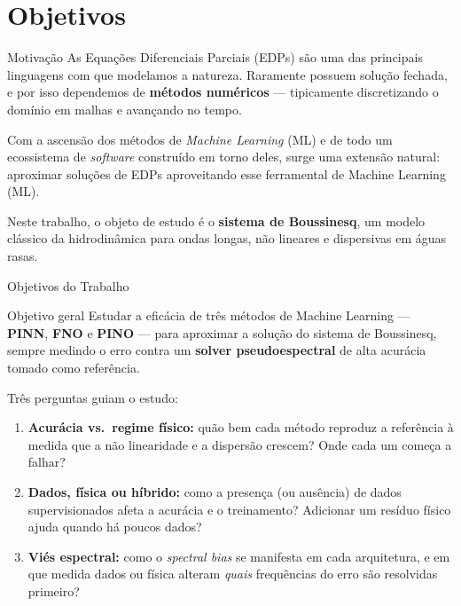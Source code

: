\section{Objetivos}

\begin{frame}{Motivação}
  As Equações Diferenciais Parciais (EDPs) são uma das principais linguagens com que
  modelamos a natureza. Raramente possuem solução fechada, e por isso dependemos de
  \textbf{métodos numéricos} --- tipicamente discretizando o domínio em malhas e avançando
  no tempo.

  \vspace{0.4cm}
  \begin{information}
    Com a ascensão dos métodos de \emph{Machine Learning} (ML) e de todo um ecossistema de
    \emph{software} construído em torno deles, surge uma extensão natural: aproximar
    soluções de EDPs \alert{aproveitando esse ferramental de Machine Learning} (ML).
  \end{information}

  \vspace{0.3cm}
  Neste trabalho, o objeto de estudo é o \textbf{sistema de Boussinesq}, um modelo clássico
  da hidrodinâmica para ondas longas, não lineares e dispersivas em águas rasas.
\end{frame}

\begin{frame}{Objetivos do Trabalho}
  \begin{block}{Objetivo geral}
    Estudar a \alert{eficácia} de três métodos de Machine Learning --- \textbf{PINN}, \textbf{FNO} e
    \textbf{PINO} --- para aproximar a solução do sistema de Boussinesq, sempre medindo o
    erro contra um \textbf{solver pseudoespectral} de alta acurácia tomado como referência.
  \end{block}

  \vspace{0.2cm}
  Três perguntas guiam o estudo:
  \begin{enumerate}
    \item \textbf{Acurácia vs.\ regime físico:} quão bem cada método reproduz a referência à
          medida que a não linearidade e a dispersão crescem? Onde cada um começa a falhar?
    \item \textbf{Dados, física ou híbrido:} como a presença (ou ausência) de dados
          supervisionados afeta a acurácia e o treinamento? Adicionar um resíduo físico
          ajuda quando há poucos dados?
    \item \textbf{Viés espectral:} como o \emph{spectral bias} se manifesta em cada
          arquitetura, e em que medida dados ou física alteram \emph{quais} frequências do
          erro são resolvidas primeiro?
  \end{enumerate}
\end{frame}
